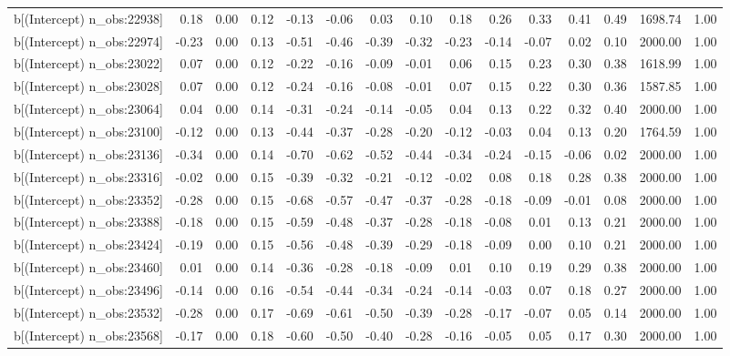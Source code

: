 \begin{table}[ht]
\begin{tabular}{rrrrrrrrrrrrrrr}
  b[(Intercept) n\_obs:22938] & 0.18 & 0.00 & 0.12 & -0.13 & -0.06 & 0.03 & 0.10 & 0.18 & 0.26 & 0.33 & 0.41 & 0.49 & 1698.74 & 1.00 \\ 
  b[(Intercept) n\_obs:22974] & -0.23 & 0.00 & 0.13 & -0.51 & -0.46 & -0.39 & -0.32 & -0.23 & -0.14 & -0.07 & 0.02 & 0.10 & 2000.00 & 1.00 \\ 
  b[(Intercept) n\_obs:23022] & 0.07 & 0.00 & 0.12 & -0.22 & -0.16 & -0.09 & -0.01 & 0.06 & 0.15 & 0.23 & 0.30 & 0.38 & 1618.99 & 1.00 \\ 
  b[(Intercept) n\_obs:23028] & 0.07 & 0.00 & 0.12 & -0.24 & -0.16 & -0.08 & -0.01 & 0.07 & 0.15 & 0.22 & 0.30 & 0.36 & 1587.85 & 1.00 \\ 
  b[(Intercept) n\_obs:23064] & 0.04 & 0.00 & 0.14 & -0.31 & -0.24 & -0.14 & -0.05 & 0.04 & 0.13 & 0.22 & 0.32 & 0.40 & 2000.00 & 1.00 \\ 
  b[(Intercept) n\_obs:23100] & -0.12 & 0.00 & 0.13 & -0.44 & -0.37 & -0.28 & -0.20 & -0.12 & -0.03 & 0.04 & 0.13 & 0.20 & 1764.59 & 1.00 \\ 
  b[(Intercept) n\_obs:23136] & -0.34 & 0.00 & 0.14 & -0.70 & -0.62 & -0.52 & -0.44 & -0.34 & -0.24 & -0.15 & -0.06 & 0.02 & 2000.00 & 1.00 \\ 
  b[(Intercept) n\_obs:23316] & -0.02 & 0.00 & 0.15 & -0.39 & -0.32 & -0.21 & -0.12 & -0.02 & 0.08 & 0.18 & 0.28 & 0.38 & 2000.00 & 1.00 \\ 
  b[(Intercept) n\_obs:23352] & -0.28 & 0.00 & 0.15 & -0.68 & -0.57 & -0.47 & -0.37 & -0.28 & -0.18 & -0.09 & -0.01 & 0.08 & 2000.00 & 1.00 \\ 
  b[(Intercept) n\_obs:23388] & -0.18 & 0.00 & 0.15 & -0.59 & -0.48 & -0.37 & -0.28 & -0.18 & -0.08 & 0.01 & 0.13 & 0.21 & 2000.00 & 1.00 \\ 
  b[(Intercept) n\_obs:23424] & -0.19 & 0.00 & 0.15 & -0.56 & -0.48 & -0.39 & -0.29 & -0.18 & -0.09 & 0.00 & 0.10 & 0.21 & 2000.00 & 1.00 \\ 
  b[(Intercept) n\_obs:23460] & 0.01 & 0.00 & 0.14 & -0.36 & -0.28 & -0.18 & -0.09 & 0.01 & 0.10 & 0.19 & 0.29 & 0.38 & 2000.00 & 1.00 \\ 
  b[(Intercept) n\_obs:23496] & -0.14 & 0.00 & 0.16 & -0.54 & -0.44 & -0.34 & -0.24 & -0.14 & -0.03 & 0.07 & 0.18 & 0.27 & 2000.00 & 1.00 \\ 
  b[(Intercept) n\_obs:23532] & -0.28 & 0.00 & 0.17 & -0.69 & -0.61 & -0.50 & -0.39 & -0.28 & -0.17 & -0.07 & 0.05 & 0.14 & 2000.00 & 1.00 \\ 
  b[(Intercept) n\_obs:23568] & -0.17 & 0.00 & 0.18 & -0.60 & -0.50 & -0.40 & -0.28 & -0.16 & -0.05 & 0.05 & 0.17 & 0.30 & 2000.00 & 1.00 \\ 

\end{tabular}
\end{table}
